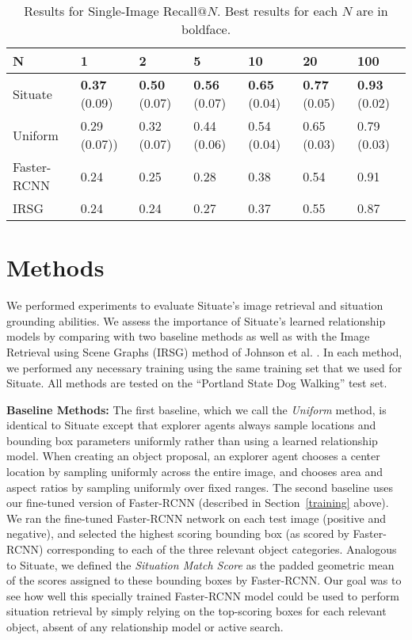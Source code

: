\documentclass[conference]{IEEEtran}
\begin{document}
\begin{table*}[t]
\caption{Results for Single-Image Recall$@N$.  Best results for each $N$ are in boldface.}  
\label{RecallAtNTable}
\centering
\begin{tabular}{|l|l|l|l|l|l|l|} \hline
N           & 1          & 2      & 5          & 10         & 20         & 100  \\ \hline
Situate     & {\bf 0.37} (0.09) & {\bf 0.50} (0.07)         & {\bf 0.56} (0.07) & {\bf 0.65} (0.04) & {\bf 0.77} (0.05) & {\bf 0.93} (0.02)  \\ \hline
Uniform     & 0.29 (0.07))& 0.32 (0.07)   & 0.44 (0.06)   & 0.54 (0.04)      & 0.65 (0.03)       & 0.79 (0.03) \\ \hline
Faster-RCNN & 0.24      & 0.25     & 0.28       & 0.38       & 0.54       & 0.91 \\ \hline
IRSG        & 0.24      & 0.24     & 0.27       & 0.37       & 0.55       & 0.87 \\ \hline
\end{tabular}

\end{table*}

\section{Methods \label{methods}}

We performed experiments to evaluate Situate's image retrieval and
situation grounding abilities.  We assess the importance of Situate's
learned relationship models by comparing with two baseline methods as
well as with the Image Retrieval using Scene Graphs (IRSG) method of
Johnson et al. \cite{Johnson2015a}.  In each method, we performed any
necessary training using the same training set that we used for
Situate.  All methods are tested on the ``Portland State Dog Walking''
test set.

{\bf Baseline Methods:} The first baseline, which we call the {\it
  Uniform} method, is identical to Situate except that explorer agents
always sample locations and bounding box parameters uniformly rather
than using a learned relationship model.  When creating an object
proposal, an explorer agent chooses a center location by sampling
uniformly across the entire image, and chooses area and aspect ratios
by sampling uniformly over fixed ranges.  The second baseline uses our
fine-tuned version of Faster-RCNN (described in Section~\ref{training}
above).  We ran the fine-tuned Faster-RCNN network on each test image
(positive and negative), and selected the highest scoring bounding box
(as scored by Faster-RCNN) corresponding to each of the three relevant
object categories.  Analogous to Situate, we defined the {\it
  Situation Match Score} as the padded geometric mean of the scores
assigned to these bounding boxes by Faster-RCNN.  Our goal was to see
how well this specially trained Faster-RCNN model could be used to
perform situation retrieval by simply relying on the top-scoring boxes
for each relevant object, absent of any relationship model or active
search.
\end{document}
